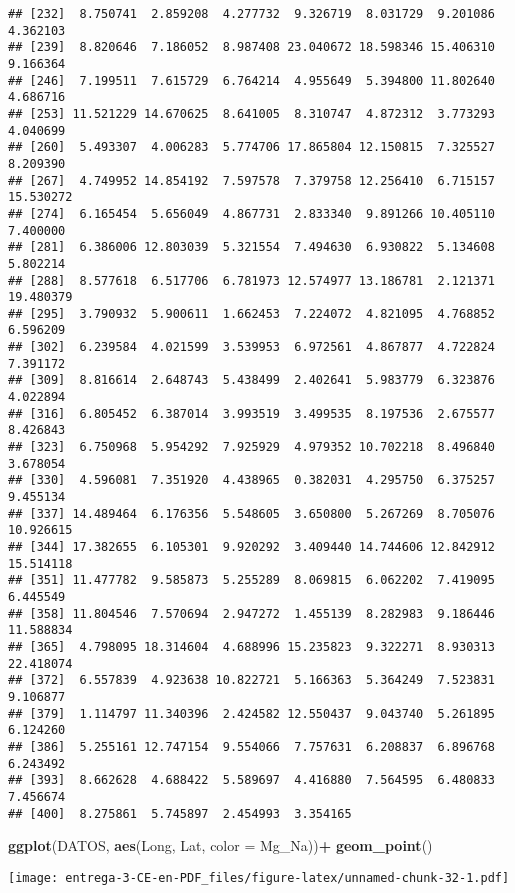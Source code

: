\documentclass[
]{article}
\newenvironment{Shaded}{\begin{snugshade}}{\end{snugshade}}
\newcommand{\DataTypeTok}[1]{\textcolor[rgb]{0.13,0.29,0.53}{#1}}
\newcommand{\KeywordTok}[1]{\textcolor[rgb]{0.13,0.29,0.53}{\textbf{#1}}}
\newcommand{\NormalTok}[1]{#1}
\newcommand{\OperatorTok}[1]{\textcolor[rgb]{0.81,0.36,0.00}{\textbf{#1}}}
\newcommand{\StringTok}[1]{\textcolor[rgb]{0.31,0.60,0.02}{#1}}
\begin{document}
\begin{verbatim}
## [232]  8.750741  2.859208  4.277732  9.326719  8.031729  9.201086  4.362103
## [239]  8.820646  7.186052  8.987408 23.040672 18.598346 15.406310  9.166364
## [246]  7.199511  7.615729  6.764214  4.955649  5.394800 11.802640  4.686716
## [253] 11.521229 14.670625  8.641005  8.310747  4.872312  3.773293  4.040699
## [260]  5.493307  4.006283  5.774706 17.865804 12.150815  7.325527  8.209390
## [267]  4.749952 14.854192  7.597578  7.379758 12.256410  6.715157 15.530272
## [274]  6.165454  5.656049  4.867731  2.833340  9.891266 10.405110  7.400000
## [281]  6.386006 12.803039  5.321554  7.494630  6.930822  5.134608  5.802214
## [288]  8.577618  6.517706  6.781973 12.574977 13.186781  2.121371 19.480379
## [295]  3.790932  5.900611  1.662453  7.224072  4.821095  4.768852  6.596209
## [302]  6.239584  4.021599  3.539953  6.972561  4.867877  4.722824  7.391172
## [309]  8.816614  2.648743  5.438499  2.402641  5.983779  6.323876  4.022894
## [316]  6.805452  6.387014  3.993519  3.499535  8.197536  2.675577  8.426843
## [323]  6.750968  5.954292  7.925929  4.979352 10.702218  8.496840  3.678054
## [330]  4.596081  7.351920  4.438965  0.382031  4.295750  6.375257  9.455134
## [337] 14.489464  6.176356  5.548605  3.650800  5.267269  8.705076 10.926615
## [344] 17.382655  6.105301  9.920292  3.409440 14.744606 12.842912 15.514118
## [351] 11.477782  9.585873  5.255289  8.069815  6.062202  7.419095  6.445549
## [358] 11.804546  7.570694  2.947272  1.455139  8.282983  9.186446 11.588834
## [365]  4.798095 18.314604  4.688996 15.235823  9.322271  8.930313 22.418074
## [372]  6.557839  4.923638 10.822721  5.166363  5.364249  7.523831  9.106877
## [379]  1.114797 11.340396  2.424582 12.550437  9.043740  5.261895  6.124260
## [386]  5.255161 12.747154  9.554066  7.757631  6.208837  6.896768  6.243492
## [393]  8.662628  4.688422  5.589697  4.416880  7.564595  6.480833  7.456674
## [400]  8.275861  5.745897  2.454993  3.354165
\end{verbatim}

\begin{Shaded}
\begin{Highlighting}[]
\KeywordTok{ggplot}\NormalTok{(DATOS, }\KeywordTok{aes}\NormalTok{(Long, Lat, }\DataTypeTok{color =}\NormalTok{ Mg_Na))}\OperatorTok{+}
\StringTok{  }\KeywordTok{geom_point}\NormalTok{()}
\end{Highlighting}
\end{Shaded}

\texttt{[image: entrega-3-CE-en-PDF\_files/figure-latex/unnamed-chunk-32-1.pdf]}
\end{document}
